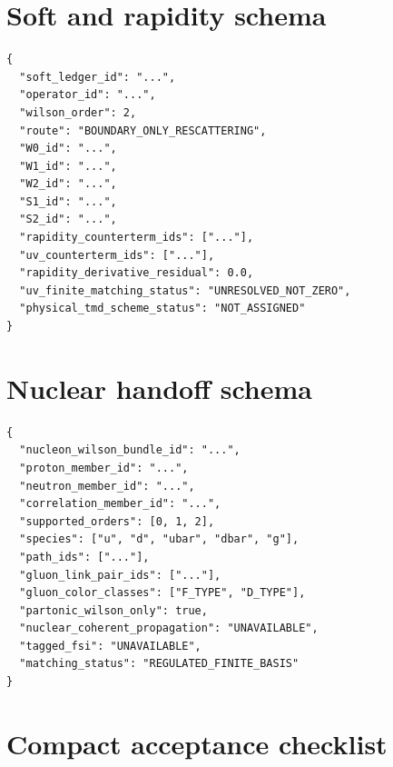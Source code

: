 \documentclass[11pt]{article}
\begin{document}
\section{Soft and rapidity schema}
\label{app:soft-schema}

\begin{verbatim}
{
  "soft_ledger_id": "...",
  "operator_id": "...",
  "wilson_order": 2,
  "route": "BOUNDARY_ONLY_RESCATTERING",
  "W0_id": "...",
  "W1_id": "...",
  "W2_id": "...",
  "S1_id": "...",
  "S2_id": "...",
  "rapidity_counterterm_ids": ["..."],
  "uv_counterterm_ids": ["..."],
  "rapidity_derivative_residual": 0.0,
  "uv_finite_matching_status": "UNRESOLVED_NOT_ZERO",
  "physical_tmd_scheme_status": "NOT_ASSIGNED"
}
\end{verbatim}

\section{Nuclear handoff schema}
\label{app:nuclear-schema}

\begin{verbatim}
{
  "nucleon_wilson_bundle_id": "...",
  "proton_member_id": "...",
  "neutron_member_id": "...",
  "correlation_member_id": "...",
  "supported_orders": [0, 1, 2],
  "species": ["u", "d", "ubar", "dbar", "g"],
  "path_ids": ["..."],
  "gluon_link_pair_ids": ["..."],
  "gluon_color_classes": ["F_TYPE", "D_TYPE"],
  "partonic_wilson_only": true,
  "nuclear_coherent_propagation": "UNAVAILABLE",
  "tagged_fsi": "UNAVAILABLE",
  "matching_status": "REGULATED_FINITE_BASIS"
}
\end{verbatim}

\section{Compact acceptance checklist}
\label{app:checklist}
\end{document}
